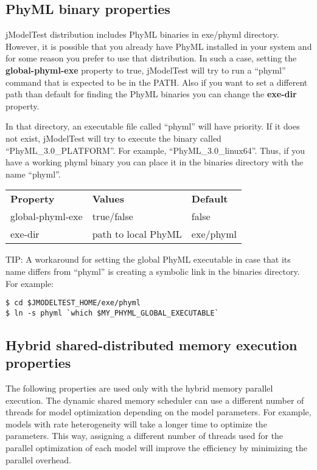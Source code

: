 \subsection{PhyML binary properties}

jModelTest distribution includes PhyML binaries in exe/phyml directory. However, it is possible that you already have PhyML installed in your system and for some reason you prefer to use that distribution. In such a case, setting the {\bf global-phyml-exe} property to true, jModelTest will try to run a ``phyml'' command that is expected to be in the PATH. Also if you want to set a different path than default for finding the PhyML binaries you can change the {\bf exe-dir} property.

In that directory, an executable file called ``phyml'' will have priority. If it does not exist, jModelTest will try to execute the binary called ``PhyML\_3.0\_PLATFORM''. For example, ``PhyML\_3.0\_linux64''. Thus, if you have a working phyml binary you can place it in the binaries directory with the name ``phyml''.

\begin{center}
\begin{tabular}{|l|l|l|}
\hline
{\bf Property} & {\bf Values} & {\bf Default} \\
global-phyml-exe & true/false &  false \\
exe-dir	         & path to local PhyML & exe/phyml \\ 
\hline
\end{tabular}
\end{center}

TIP: A workaround for setting the global PhyML executable in case that its name differs from ``phyml'' is creating a symbolic link in the binaries directory. For example:

\begin{lstlisting}
$ cd $JMODELTEST_HOME/exe/phyml
$ ln -s phyml `which $MY_PHYML_GLOBAL_EXECUTABLE`
\end{lstlisting}

\subsection{Hybrid shared-distributed memory execution properties}

The following properties are used only with the hybrid memory parallel execution. The dynamic shared memory scheduler can use a different number of threads for model optimization depending on the model parameters. For example, models with rate heterogeneity will take a longer time to optimize the parameters. This way, assigning a different number of threads used for the parallel optimization of each model will improve the efficiency by minimizing the parallel overhead.

